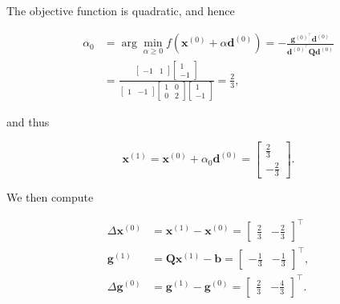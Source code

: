 The objective function is quadratic, and hence

\[
	\begin{aligned}
		\alpha_{0} & =\arg \min _{\alpha \geq 0} f\left(\boldsymbol{x}^{(0)}+\alpha \boldsymbol{d}^{(0)}\right)=-\frac{\boldsymbol{g}^{(0)^{\top}} \boldsymbol{d}^{(0)}}{\boldsymbol{d}^{(0)^{\top}} \boldsymbol{Q} \boldsymbol{d}^{(0)}} \\
		& =\frac{\left[\begin{array}{ll}
				-1 & 1
			\end{array}\right]\left[\begin{array}{c}
				1 \\
				-1
			\end{array}\right]}{\left[\begin{array}{ll}
				1 & -1
			\end{array}\right]\left[\begin{array}{ll}
				1 & 0 \\
				0 & 2
			\end{array}\right]\left[\begin{array}{c}
				1 \\
				-1
			\end{array}\right]}=\frac{2}{3},
	\end{aligned}
\]

and thus

\[
	\boldsymbol{x}^{(1)}=\boldsymbol{x}^{(0)}+\alpha_{0} \boldsymbol{d}^{(0)}=\left[\begin{array}{c}
		\frac{2}{3} \\
		-\frac{2}{3}
	\end{array}\right] .
\]

We then compute

\[
	\begin{aligned}
		\Delta \boldsymbol{x}^{(0)} & =\boldsymbol{x}^{(1)}-\boldsymbol{x}^{(0)}=\left[\begin{array}{ll}
			\frac{2}{3} & -\frac{2}{3}
		\end{array}\right]^{\top} \\
		\boldsymbol{g}^{(1)} & =\boldsymbol{Q} \boldsymbol{x}^{(1)}-\boldsymbol{b}=\left[\begin{array}{ll}
			-\frac{1}{3} & -\frac{1}{3}
		\end{array}\right]^{\top}, \\
		\Delta \boldsymbol{g}^{(0)} & =\boldsymbol{g}^{(1)}-\boldsymbol{g}^{(0)}=\left[\begin{array}{ll}
			\frac{2}{3} & -\frac{4}{3}
		\end{array}\right]^{\top} .
	\end{aligned}
\]

